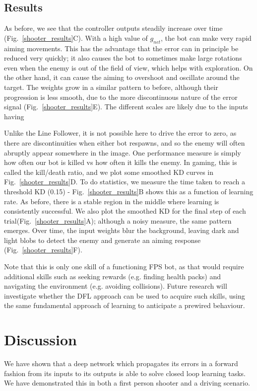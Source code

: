 \documentclass{llncs}
\begin{document}
\subsection{Results}
As before, we see that the controller outputs steadily increase over
time (Fig.~\ref{shooter_results}C). With a high value of $g_{net}$,
the bot can make very rapid aiming movements. This has the advantage
that the error can in principle be reduced very quickly; it also
causes the bot to sometimes make large rotations even when the enemy
is out of the field of view, which helps with exploration. On the
other hand, it can cause the aiming to overshoot and oscillate around
the target.  The weights grow in a similar pattern to before, although
their progression is less smooth, due to the more discontinuous nature
of the error signal (Fig.~\ref{shooter_results}E). The different scales are likely due to the inputs having 

Unlike the Line Follower, it is not possible here to drive the error
to zero, as there are discontinuities when either bot respawns, and so
the enemy will often abruptly appear somewhere in the image. One
performance measure is simply how often our bot is killed vs how often
it kills the enemy. In gaming, this is called the kill/death ratio,
and we plot some smoothed KD curves in Fig.~\ref{shooter_results}D. To
do statistics, we measure the time taken to reach a threshold KD (0.15) -
Fig.~\ref{shooter_results}B shows this as a function of learning
rate. As before, there is a stable region in the middle where learning
is consistently successful. We also plot the smoothed KD for the final
step of each trial(Fig.~\ref{shooter_results}A); although a noisy
measure, the same pattern emerges. Over time, the input weights blur
the background, leaving dark and light blobs to detect the enemy and
generate an aiming response (Fig.~\ref{shooter_results}F).

Note that this is only one skill of a functioning FPS bot, as that would
require additional skills such as seeking rewards (e.g. finding health packs) and
navigating the environment (e.g. avoiding collisions). Future research
will investigate whether the DFL approach can be used to acquire such
skills, using the same fundamental approach of learning to anticipate
a prewired behaviour.


\section{Discussion}
We have shown that a deep network which propagates its errors in a forward
fashion from its inputs to its outputs is able to solve closed loop
learning tasks. We have demonstrated this in both a first person
shooter and a driving scenario.
\end{document}
